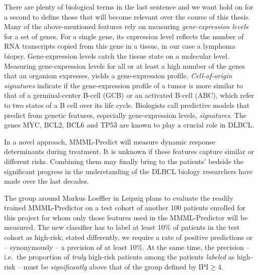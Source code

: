 There are plenty of biological terms in the last sentence and we want hold on for a second to 
define those that will become relevant over the course of this thesis.
Many of the above-mentioned features rely on measuring \textit{gene-expression levels} for a set 
of genes. 
For a single gene, its expression level reflects the number of RNA transcripts copied from 
this gene in a tissue, in our case a lymphoma biopsy. Gene-expression levels catch the tissue
state on a molecular level. Measuring gene-expression levels for all 
or at least a high number of the genes that an organism expresses, yields a gene-expression 
profile. \textit{Cell-of-origin signatures} indicate if the gene-expression profile 
of a tumor is more similar to that of a germinal-center B-cell (GCB) or an activated B-cell (ABC), 
which refer to two states of a B cell over its life cycle. Biologists call predictive models that 
predict from genetic features, especially gene-expression levels, \textit{signatures}. The genes 
MYC, BCL2, BCL6 and TP53 are known to play a crucial role in DLBCL.

In a novel approach, MMML-Predict will measure dynamic response determinants during treatment. It is 
unknown if these features capture similar or different 
risks. Combining them may finally bring to the patients' bedside the significant progress in the 
understanding of the DLBCL biology researchers have made over the last decades.

The group around Markus Loeffler in Leipzig plans to evaluate the readily trained MMML-Predictor on 
a test cohort of another \num{100} patients enrolled for this project for whom only those features 
used in the MMML-Predictor will be measured. The new classifier has to label at least \num{10}\% of 
patients in the test cohort as high-risk; stated differently, we require a rate of positive 
predictions or -- synonymously -- a precision of at least \num{10}\%. At the same time, the 
precision -- i.e.\ the proportion of \textit{truly} high-risk patients among the patients 
\textit{labeled} as high-risk -- must be \textit{significantly} above that of the group defined by
$\text{IPI} \geq 4$. 

